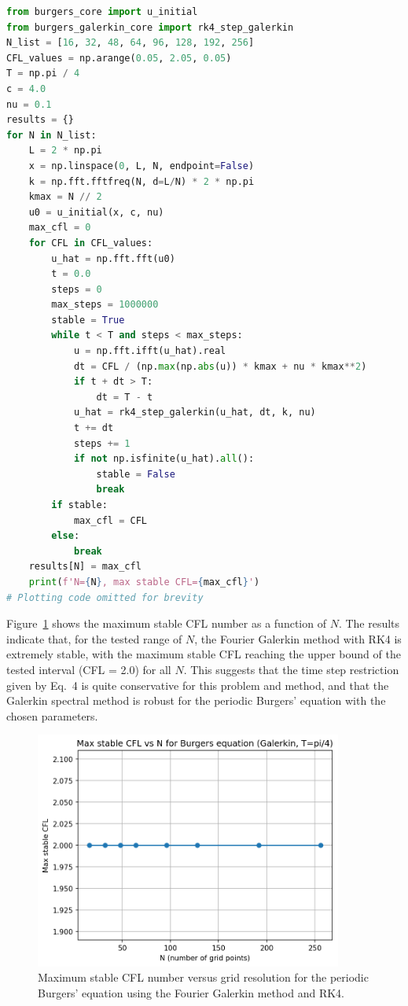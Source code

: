 \documentclass{article}
\begin{document}
\begin{lstlisting}[language=Python]
from burgers_core import u_initial
from burgers_galerkin_core import rk4_step_galerkin
N_list = [16, 32, 48, 64, 96, 128, 192, 256]
CFL_values = np.arange(0.05, 2.05, 0.05)
T = np.pi / 4
c = 4.0
nu = 0.1
results = {}
for N in N_list:
    L = 2 * np.pi
    x = np.linspace(0, L, N, endpoint=False)
    k = np.fft.fftfreq(N, d=L/N) * 2 * np.pi
    kmax = N // 2
    u0 = u_initial(x, c, nu)
    max_cfl = 0
    for CFL in CFL_values:
        u_hat = np.fft.fft(u0)
        t = 0.0
        steps = 0
        max_steps = 1000000
        stable = True
        while t < T and steps < max_steps:
            u = np.fft.ifft(u_hat).real
            dt = CFL / (np.max(np.abs(u)) * kmax + nu * kmax**2)
            if t + dt > T:
                dt = T - t
            u_hat = rk4_step_galerkin(u_hat, dt, k, nu)
            t += dt
            steps += 1
            if not np.isfinite(u_hat).all():
                stable = False
                break
        if stable:
            max_cfl = CFL
        else:
            break
    results[N] = max_cfl
    print(f'N={N}, max stable CFL={max_cfl}')
# Plotting code omitted for brevity
\end{lstlisting}

Figure~\ref{fig:burgers_galerkin_cfl_stability} shows the maximum stable CFL number as a function of $N$. The results indicate that, for the tested range of $N$, the Fourier Galerkin method with RK4 is extremely stable, with the maximum stable CFL reaching the upper bound of the tested interval (CFL = 2.0) for all $N$. This suggests that the time step restriction given by Eq.~4 is quite conservative for this problem and method, and that the Galerkin spectral method is robust for the periodic Burgers' equation with the chosen parameters.

\begin{figure}[htbp]
    \centering
    \includegraphics[width=0.9\textwidth]{figure/burgers_galerkin_cfl_stability.png}
    \caption{Maximum stable CFL number versus grid resolution for the periodic Burgers' equation using the Fourier Galerkin method and RK4.}
    \label{fig:burgers_galerkin_cfl_stability}
\end{figure}
\end{document}
